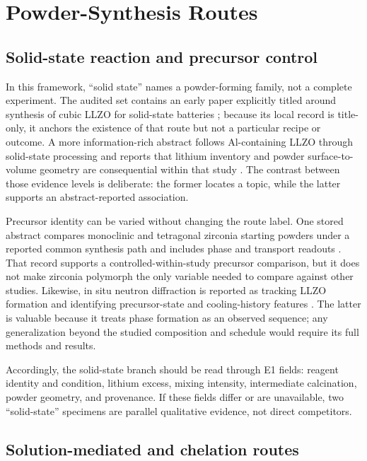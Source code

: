 \section{Powder-Synthesis Routes}

\subsection{Solid-state reaction and precursor control}

In this framework, ``solid state'' names a powder-forming family, not a complete experiment. The audited set contains an early paper explicitly titled around synthesis of cubic LLZO for solid-state batteries \cite{tan2012synthesis}; because its local record is title-only, it anchors the existence of that route but not a particular recipe or outcome. A more information-rich abstract follows Al-containing LLZO through solid-state processing and reports that lithium inventory and powder surface-to-volume geometry are consequential within that study \cite{heywood2023tailoring}. The contrast between those evidence levels is deliberate: the former locates a topic, while the latter supports an abstract-reported association.

Precursor identity can be varied without changing the route label. One stored abstract compares monoclinic and tetragonal zirconia starting powders under a reported common synthesis path and includes phase and transport readouts \cite{rahmawati2021a}. That record supports a controlled-within-study precursor comparison, but it does not make zirconia polymorph the only variable needed to compare against other studies. Likewise, in situ neutron diffraction is reported as tracking LLZO formation and identifying precursor-state and cooling-history features \cite{rao2015in}. The latter is valuable because it treats phase formation as an observed sequence; any generalization beyond the studied composition and schedule would require its full methods and results.

Accordingly, the solid-state branch should be read through E1 fields: reagent identity and condition, lithium excess, mixing intensity, intermediate calcination, powder geometry, and provenance. If these fields differ or are unavailable, two ``solid-state'' specimens are parallel qualitative evidence, not direct competitors.

\subsection{Solution-mediated and chelation routes}

